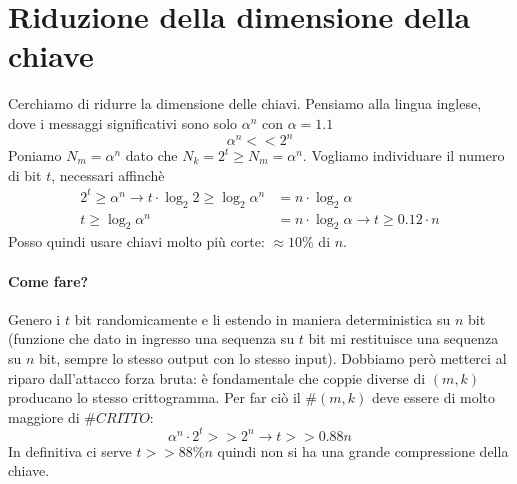 \section{Riduzione della dimensione della chiave}
Cerchiamo di ridurre la dimensione delle chiavi. Pensiamo alla lingua inglese, dove i messaggi significativi sono solo $\alpha^{n}$ con $\alpha = 1.1$
$$\alpha^n << 2^n$$
Poniamo $N_m = \alpha^n$ dato che $N_k = 2^t \geq N_m = \alpha^n$. Vogliamo individuare il numero di bit $t$, necessari affinchè 
\begin{align*}
	2^t \geq \alpha^n \longrightarrow t \cdot \log_2 2 \geq \log_2\alpha^n &= n \cdot \log_2\alpha \\ t \geq \log_2\alpha^n &= n \cdot \log_2\alpha \longrightarrow t \geq 0.12 \cdot n
\end{align*}
Posso quindi usare chiavi molto più corte: $\approx 10\%$ di $n$.

\paragraph{Come fare?} Genero i $t$ bit randomicamente e li estendo in maniera deterministica su $n$ bit (funzione che dato in ingresso una sequenza su $t$ bit mi restituisce una sequenza su $n$ bit, sempre lo stesso output con lo stesso input).
Dobbiamo però metterci al riparo dall'attacco forza bruta: è fondamentale che coppie diverse di
$(m, k)$ producano lo stesso crittogramma. Per far ciò il $\#(m, k)$ deve essere di molto maggiore di $\#CRITTO$:
$$ \alpha^n \cdot 2^t >> 2^n \xrightarrow{} t >> 0.88n$$
In definitiva ci serve $t >> 88\%n$ quindi non si ha una grande compressione della chiave.
